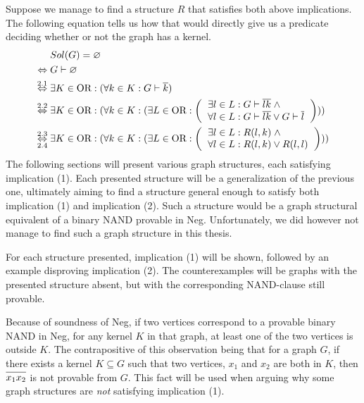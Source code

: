 Suppose we manage to find a structure $R$ that satisfies both above implications.
The following equation tells us how that would directly give us a predicate deciding whether or not the graph has a kernel.
\begin{align}
  &Sol(G) = \varnothing\\
  \Leftrightarrow\; &G \vdash \varnothing\\
  \overset{2.1}{\Leftrightarrow}\;&\exists K \in \text{OR}: (\forall  k \in K: G \vdash \ol{k})\\
  \overset{2.2}{\Leftrightarrow}\;&\exists K \in \text{OR}: (\forall  k \in K: ( \exists L \in \text{OR}:
  \left ( \begin{tabular}{l}
  $\exists l \in L: G \vdash \ol{lk} \; \wedge$\\
  $\forall l \in L: G \vdash \ol{lk} \vee G \vdash \ol{l}$
  \end{tabular} \right ) ) )\\
  \overset{2.3}{\underset{2.4}{\Leftrightarrow}}\;&\exists K \in \text{OR}: (\forall  k \in K: ( \exists L \in \text{OR}:
  \left ( \begin{tabular}{l}
  $\exists l \in L: R(l,k) \; \wedge$\\
  $\forall l \in L: R(l,k) \vee R(l,l)$
  \end{tabular} \right ) ) )
\end{align}
The following sections will present various graph structures, each satisfying implication (1).
Each presented structure will be a generalization of the previous one, ultimately aiming to find a structure general enough to satisfy both implication (1) and implication (2).
Such a structure would be a graph structural equivalent of a binary NAND provable in Neg.
Unfortunately, we did however not manage to find such a graph structure in this thesis.

For each structure presented, implication (1) will be shown, followed by an example disproving implication (2).
The counterexamples will be graphs with the presented structure absent, but with the corresponding NAND-clause still provable.

Because of soundness of Neg, if two vertices correspond to a provable binary NAND in Neg, for any kernel $K$ in that graph, at least one of the two vertices is outside $K$.
The contrapositive of this observation being that for a graph $G$, if there exists a kernel $K \subseteq G$ such that two vertices, $x_1$ and $x_2$ are both in $K$, then $\ol{x_1x_2}$ is not provable from $G$.
This fact will be used when arguing why some graph structures are \textit{not} satisfying implication (1).
